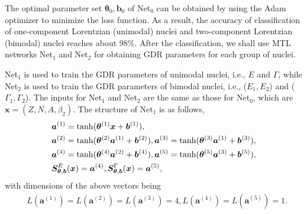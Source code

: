 \documentclass[twocolumn,showpacs,superscriptaddress,amsmath,amssymb,prc,preprintnumbers]{revtex4-1}
\begin{document}
The optimal parameter set $\boldsymbol{\theta}_{0},\boldsymbol{b}_{0}$ of Net$_0$ can be obtained by using the Adam optimizer \cite{kingma2014adam} to minimize the loss function. As a result, the accuracy of classification of one-component Lorentzian (unimodal) nuclei and two-component Lorentzian (bimodal) nuclei  reaches about 98\%. After the classification, we shall use MTL networks Net$_1$ and Net$_2$ for obtaining GDR parameters for each group of nuclei.


Net$_1$ is used to train the GDR parameters of unimodal nuclei, i.e., $E$ and $\Gamma$, while Net$_2$ is used to train the GDR parameters of bimodal nuclei, i.e., ($E_1, E_2$) and ($\Gamma_1, \Gamma_2$). The inputs for Net$_1$ and Net$_2$ are the same as those for Net$_0$, which are $\boldsymbol{x} = (Z, N, A, \beta_2)$.
The structure of Net$_1$ is as follows,
\begin{align}
&\boldsymbol{a}^{(1)} = {\rm tanh}(\boldsymbol{\theta}^{(1)} \boldsymbol{x}  + \boldsymbol{b}^{(1)}) ,\notag\\
&\boldsymbol{a}^{(2)} = {\rm tanh}(\boldsymbol{\theta}^{(2)} \boldsymbol{a}^{(1)}  + \boldsymbol{b}^{(2)}) ,
\boldsymbol{a}^{(3)} = {\rm tanh}(\boldsymbol{\theta}^{(3)} \boldsymbol{a}^{(1)} + \boldsymbol{b}^{(3)}) ,\notag\\
&\boldsymbol{a}^{(4)} = {\rm tanh}(\boldsymbol{\theta}^{(4)} \boldsymbol{a}^{(2)} + \boldsymbol{b}^{(4)}) ,
\boldsymbol{a}^{(5)} = {\rm tanh}(\boldsymbol{\theta}^{(5)} \boldsymbol{a}^{(3)} + \boldsymbol{b}^{(5)}) ,\notag\\
&\boldsymbol{S}^E_{\boldsymbol{\theta},\boldsymbol{b}}(\boldsymbol{x}) = \boldsymbol{a}^{(4)}, \boldsymbol{S}^\Gamma_{\boldsymbol{\theta},\boldsymbol{b}}(\boldsymbol{x}) = \boldsymbol{a}^{(5)} ,
\end{align}
with dimensions of the above vectors being
\begin{align}
&L(\boldsymbol{a}^{(1)}) =L(\boldsymbol{a}^{(2)})=L(\boldsymbol{a}^{(3)})= 4 ,L(\boldsymbol{a}^{(4)}) =L(\boldsymbol{a}^{(5)})=1.
\end{align}
\end{document}
